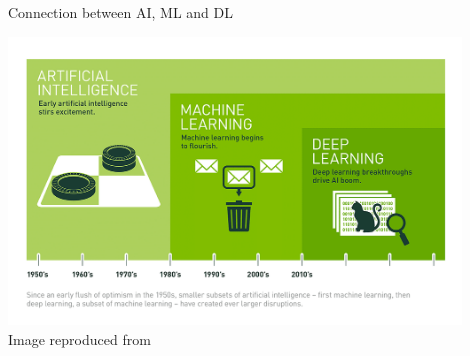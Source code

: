 \begin{frame}{Connection between AI, ML and DL}

    \begin{center}
        \includegraphics[width=0.90\textwidth]{./images/dl_intro/ai_ml_dl.png}\\
        {\scriptsize Image reproduced from \cite{NVidiaBlog:DifferenceBetweenAIMLDL}}\\
    \end{center}

\end{frame}
    